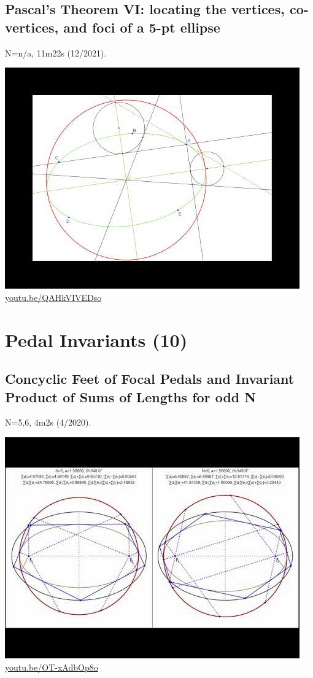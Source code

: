 \documentclass[12pt]{amsart}
\begin{document}
\subsection{Pascal's Theorem VI: locating the vertices, co-vertices, and foci of a 5-pt ellipse}
\label{vid:QAHkVIVEDso}
\noindent N=n/a, 11m22s (12/2021). 
\begin{center}\includegraphics[width=.5\textwidth]{pics/QAHkVIVEDso.jpg} \\ 
\href{https://youtu.be/QAHkVIVEDso}{\url{youtu.be/QAHkVIVEDso}}\end{center}
% 


\section{Pedal Invariants (10)}

\subsection{Concyclic Feet of Focal Pedals and Invariant Product of Sums of Lengths for odd N}
\label{vid:OT-xAdbOp8o}
\noindent N=5,6, 4m2s (4/2020). 
\begin{center}\includegraphics[width=.5\textwidth]{pics/OT-xAdbOp8o.jpg} \\ 
\href{https://youtu.be/OT-xAdbOp8o}{\url{youtu.be/OT-xAdbOp8o}}\end{center}
% 
\end{document}
